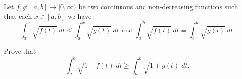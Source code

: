 Let \(f,g\colon [a,b]\to [0,\infty)\) be two continuous and non-decreasing functions such that each \(x\in [a,b]\) we have
\[ \int^x_a \sqrt { f(t) }\ dt \leq \int^x_a \sqrt { g(t) }\ dt  \ \  \textrm{and}\ \int^b_a \sqrt {f(t)}\ dt = \int^b_a \sqrt { g(t)}\ dt. \]

Prove that
\[ \int^b_a \sqrt { 1+ f(t) }\ dt \geq \int^b_a \sqrt { 1 + g(t) }\ dt. \]